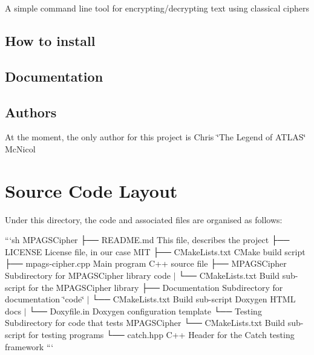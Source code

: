 A simple command line tool for encrypting/decrypting text using classical ciphers

\subsection*{How to install}

\subsection*{Documentation}

\subsection*{Authors}

At the moment, the only author for this project is Chris \char`\"{}\-The Legend of A\-T\-L\-A\-S\char`\"{} Mc\-Nicol

\section*{Source Code Layout}

Under this directory, the code and associated files are organised as follows\-:

```sh M\-P\-A\-G\-S\-Cipher ├── R\-E\-A\-D\-M\-E.\-md This file, describes the project ├── L\-I\-C\-E\-N\-S\-E License file, in our case M\-I\-T ├── C\-Make\-Lists.\-txt C\-Make build script ├── mpags-\/cipher.\-cpp Main program C++ source file ├── M\-P\-A\-G\-S\-Cipher Subdirectory for M\-P\-A\-G\-S\-Cipher library code $\vert$ └── C\-Make\-Lists.\-txt Build sub-\/script for the M\-P\-A\-G\-S\-Cipher library ├── Documentation Subdirectory for documentation \char`\"{}code\char`\"{} $\vert$ └── C\-Make\-Lists.\-txt Build sub-\/script Doxygen H\-T\-M\-L docs $\vert$ └── Doxyfile.\-in Doxygen configuration template └── Testing Subdirectory for code that tests M\-P\-A\-G\-S\-Cipher └── C\-Make\-Lists.\-txt Build sub-\/script for testing programs └── catch.\-hpp C++ Header for the Catch testing framework ``` 